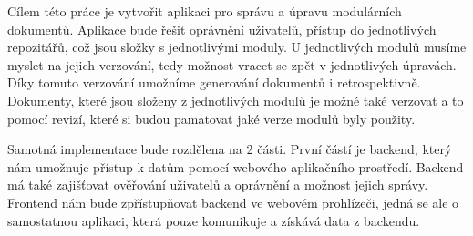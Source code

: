 Cílem této práce je vytvořit aplikaci pro správu a úpravu modulárních dokumentů. Aplikace bude řešit oprávnění uživatelů, přístup do
jednotlivých repozitářů, což jsou složky s jednotlivými moduly. U jednotlivých modulů musíme myslet na jejich verzování, tedy možnost
vracet se zpět v jednotlivých úpravách. Díky tomuto verzování umožníme generování dokumentů i retrospektivně. Dokumenty, které jsou
složeny z jednotlivých modulů je možné také verzovat a to pomocí revizí, které si budou pamatovat jaké verze modulů byly použity.

Samotná implementace bude rozdělena na 2 části. První částí je backend, který nám umožnuje přístup k datům pomocí webového aplikačního
prostředí. Backend má také zajišťovat ověřování uživatelů a oprávnění a možnost jejich správy. Frontend nám bude zpřístupňovat backend
ve webovém prohlízeči, jedná se ale o samostatnou aplikaci, která pouze komunikuje a získává data z backendu.
